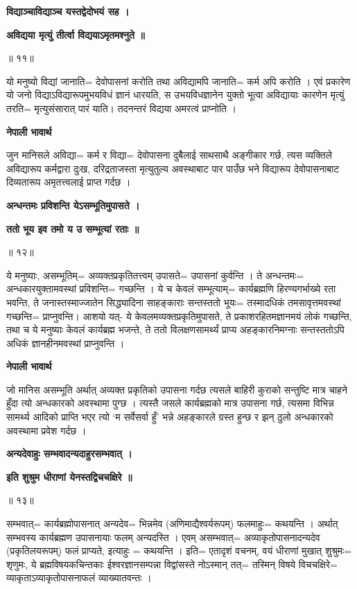 \documentclass[11pt, a5paper]{article}
\begin{document}
\textbf{विद्याञ्चाविद्याञ्च यस्तद्वेदोभयं सह ।}

\textbf{अविद्यया मृत्युं तीर्त्वा विद्ययाऽमृतमश्नुते ॥}

॥ ११॥

यो मनुष्यो विद्यां जानाति= देवोपासनां करोति तथा  अविद्यामपि जानाति= कर्म अपि करोति । एवं प्रकारेण यो जनो विद्याऽविद्यारूपमुभयविधं ज्ञानं धारयति, स उभयविधज्ञानेन युक्तो भूत्वा अविद्यायाः कारणेन मृत्युं तरति‍= मृत्युसंसारात् पारं याति। तदनन्तरं विद्यया अमरत्वं प्राप्नोति ।

\textbf{नेपाली भावार्थ}

जुन मानिसले अविद्या= कर्म र विद्या= देवोपासना दुबैलाई साथसाथै अङ्गीकार गर्छ, त्यस व्यक्तिले अविद्यारूप कर्मद्वारा दुःख, दरिद्रताजस्ता मृत्युतुल्य अवस्थाबाट पार पाउँछ भने विद्यारूप देवोपासनाबाट दिव्यतारूप अमृतत्त्वलाई प्राप्त गर्दछ ।

\textbf{अन्धन्तमः प्रविशन्ति येऽसम्भूतिमुपासते ।}

\textbf{ततो भूय इव तमो य उ सम्भूत्यां रताः ॥}

॥ १२॥

ये मनुष्याः, असम्भूतिम्= अव्यक्तप्रकृतितत्त्वम् उपासते= उपासनां कुर्वन्ति । ते अन्धन्तमः= अन्धकारयुक्तामवस्थां प्रविशन्ति= गच्छन्ति । ये च केवलं सम्भूत्याम्= कार्यब्रह्मणि हिरण्यगर्भाख्ये रता भवन्ति, ते जनास्तस्माज्जातेन सिद्ध्यादिना साहङ्काराः सन्तस्ततो भूयः= तस्मादधिकं तमसावृत्तमवस्थां गच्छन्ति= प्राप्नुवन्ति। आशयो यत्- ये केवलमव्यक्तप्रकृतिमुपासते, ते प्रकाशरहितमज्ञानमयं लोकं गच्छन्ति, तथा च ये मनुष्याः केवलं कार्यब्रह्म भजन्ते, ते ततो विलक्षणसामर्थ्यं प्राप्य अहङ्कारनिमग्नाः सन्तस्ततोऽपि अधिकं ज्ञानहीनमवस्थां प्राप्नुवन्ति ।

\textbf{नेपाली भावार्थ}

जो मानिस असम्भूति अर्थात् अव्यक्त प्रकृतिको उपासना गर्दछ त्यसले बाहिरी कुराको सन्तुष्टि मात्र चाहने हुँदा त्यो अन्धकारको अवस्थामा पुग्छ । त्यस्तै जसले कार्यब्रह्मको मात्र उपासना गर्छ, त्यसमा विभिन्न सामर्थ्य आदिको प्राप्ति भएर त्यो ‘म सर्वेसर्वा हुँ’ भन्ने अहङ्कारले ग्रस्त हुन्छ र झन् ठुलो अन्धकारको अवस्थामा प्रवेश गर्दछ ।

\textbf{अन्यदेवाहुः सम्भवादन्यदाहुरसम्भवात् ।}

\textbf{इति शुश्रुम धीराणां येनस्तद्विचचक्षिरे ॥}

॥ १३॥

सम्भवात्= कार्यब्रह्मोपासनात् अन्यदेव= भिन्नमेव (अणिमाद्यैश्वर्यरूपम्) फलमाहुः= कथयन्ति । अर्थात् सम्भवस्य कार्यब्रह्मण उपासनायाः फलम् अन्यदस्ति । एवम् असम्भवात्= अव्याकृतोपासनादन्यदेव (प्रकृतिलयरूपम्) फलं प्राप्यते, इत्याहुः = कथयन्ति । इति= एतादृशं वचनम्, वयं धीराणां मुखात् शुश्रुमः= शृणुमः, ये ब्रह्मविषयकचिन्तकाः ईश्वरज्ञानसम्पन्ना विद्वांसस्ते नोऽस्मान् तत्= तस्मिन् विषये विचचक्षिरे= व्याकृताऽव्याकृतोपासनाफलं व्याख्यातवन्तः ।
\end{document}
